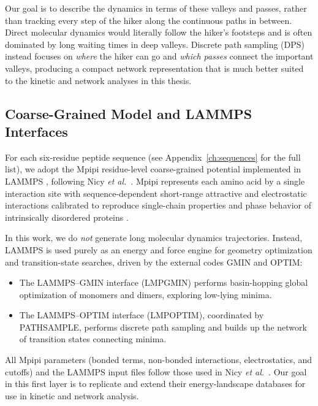 Our goal is to describe the dynamics in terms of these valleys and passes, rather
than tracking every step of the hiker along the continuous paths in between. Direct
molecular dynamics would literally follow the hiker's footsteps and is often dominated
by long waiting times in deep valleys. Discrete path sampling (DPS) instead focuses on
\emph{where} the hiker can go and \emph{which passes} connect the important valleys,
producing a compact network representation that is much better suited to the kinetic
and network analyses in this thesis.

\subsection{Coarse-Grained Model and LAMMPS Interfaces}\label{subsec:mpipi}

For each six-residue peptide sequence (see Appendix~\ref{ch:sequences} for the full
list), we adopt the Mpipi residue-level coarse-grained potential implemented in LAMMPS
\cite{Thompson2022LAMMPS}, following Nicy \emph{et al.}\ \cite{Nicy2024Mpipi}. Mpipi
represents each amino acid by a single interaction site with sequence-dependent
short-range attractive and electrostatic interactions calibrated to reproduce
single-chain properties and phase behavior of intrinsically disordered proteins
\cite{Joseph2021Mpipi}.

In this work, we do \emph{not} generate long molecular dynamics trajectories.
Instead, LAMMPS is used purely as an energy and force engine for geometry optimization
and transition-state searches, driven by the external codes GMIN and OPTIM:

\begin{itemize}
  \item The LAMMPS--GMIN interface (LMPGMIN) performs basin-hopping global optimization
        of monomers and dimers, exploring low-lying minima.
  \item The LAMMPS--OPTIM interface (LMPOPTIM), coordinated by PATHSAMPLE, performs
        discrete path sampling and builds up the network of transition states connecting
        minima.
\end{itemize}

All Mpipi parameters (bonded terms, non-bonded interactions, electrostatics, and
cutoffs) and the LAMMPS input files follow those used in Nicy \emph{et al.}\
\cite{Nicy2024Mpipi}. Our goal in this first layer is to replicate and extend their
energy-landscape databases for use in kinetic and network analysis.

